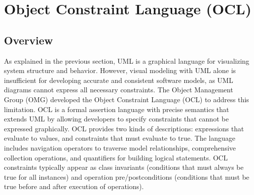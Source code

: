 \section{Object Constraint Language (OCL)}

\subsection{Overview}

\hspace{1cm} As explained in the previous section, UML is a graphical language for 
visualizing system structure and behavior. However, visual modeling with UML alone 
is insufficient for developing accurate and consistent software models, as UML 
diagrams cannot express all necessary constraints. The Object Management Group (OMG) 
developed the Object Constraint Language (OCL) to address this limitation. 
OCL is a formal assertion language with precise semantics that extends UML by 
allowing developers to specify constraints that cannot be expressed graphically. 
OCL provides two kinds of descriptions: expressions that evaluate to values, and 
constraints that must evaluate to true. The language includes navigation operators 
to traverse model relationships, comprehensive collection operations, and 
quantifiers for building logical statements. OCL constraints typically appear as 
class invariants (conditions that must always be true for all instances) and 
operation pre/postconditions (conditions that must be true before and after 
execution of operations).

